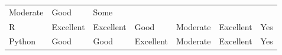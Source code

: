 \documentclass[]{book}
\begin{document}
\begin{longtable}[]{@{}lllllll@{}}
\begin{minipage}[t]{0.11\columnwidth}
Moderate\strut
\end{minipage} & \begin{minipage}[t]{0.17\columnwidth}\raggedright
Good\strut
\end{minipage} & \begin{minipage}[t]{0.05\columnwidth}\raggedright
Some\strut
\end{minipage}\tabularnewline
\begin{minipage}[t]{0.08\columnwidth}\raggedright
R\strut
\end{minipage} & \begin{minipage}[t]{0.10\columnwidth}\raggedright
Excellent\strut
\end{minipage} & \begin{minipage}[t]{0.13\columnwidth}\raggedright
Excellent\strut
\end{minipage} & \begin{minipage}[t]{0.16\columnwidth}\raggedright
Good\strut
\end{minipage} & \begin{minipage}[t]{0.11\columnwidth}\raggedright
Moderate\strut
\end{minipage} & \begin{minipage}[t]{0.17\columnwidth}\raggedright
Excellent\strut
\end{minipage} & \begin{minipage}[t]{0.05\columnwidth}\raggedright
Yes\strut
\end{minipage}\tabularnewline
\begin{minipage}[t]{0.08\columnwidth}\raggedright
Python\strut
\end{minipage} & \begin{minipage}[t]{0.10\columnwidth}\raggedright
Good\strut
\end{minipage} & \begin{minipage}[t]{0.13\columnwidth}\raggedright
Good\strut
\end{minipage} & \begin{minipage}[t]{0.16\columnwidth}\raggedright
Excellent\strut
\end{minipage} & \begin{minipage}[t]{0.11\columnwidth}\raggedright
Moderate\strut
\end{minipage} & \begin{minipage}[t]{0.17\columnwidth}\raggedright
Excellent\strut
\end{minipage} & \begin{minipage}[t]{0.05\columnwidth}\raggedright
Yes\strut
\end{minipage}\tabularnewline

\end{longtable}
\end{document}
